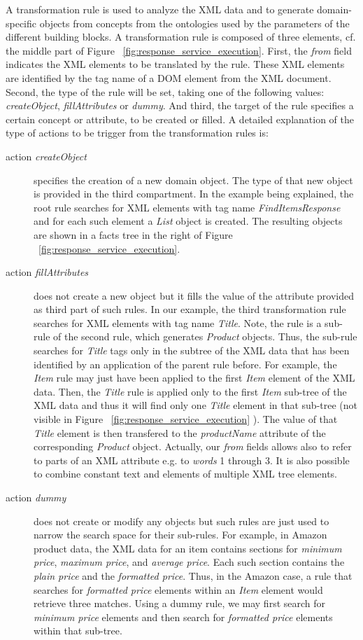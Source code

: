 A transformation rule is used to analyze the XML data and to generate domain-specific objects from concepts from the ontologies used by the parameters of the different building blocks. A transformation rule is composed of three elements, cf. the middle part of Figure ~\ref{fig:response_service_execution}. First, the \textit{from} field indicates the XML elements to be translated by the rule. These XML elements are identified by the tag name of a DOM element from the XML document. Second, the type of the rule will be set, taking one of the following values: \emph{createObject}, \emph{fillAttributes} or \emph{dummy}. And third, the target of the rule specifies a certain concept or attribute, to be created or filled. A detailed explanation of the type of actions to be trigger from the transformation rules is:
\begin{description}
	\item[action \emph{createObject}] specifies the creation of a new domain object. The type of that new object is provided in the third compartment. In the example being explained, the root rule searches for XML elements with tag name \emph{FindItemsResponse} and for each such element a \emph{List} object is created. The resulting objects are shown in a facts tree in the right of Figure ~\ref{fig:response_service_execution}.
	\item[action \emph{fillAttributes}] does not create a new object but it fills the value of the attribute provided as third part of such rules. In our example, the third transformation rule searches for XML elements with tag name \emph{Title}. Note, the rule is a sub-rule of the second rule, which generates \emph{Product} objects. Thus, the sub-rule searches for \emph{Title} tags only in the subtree of the XML data that has been identified by an application of the parent rule before. For example, the \emph{Item} rule may just have been applied to the first \emph{Item} element of the XML data. Then, the \emph{Title} rule is applied only to the first \emph{Item} sub-tree of the XML data and thus it will find only one \emph{Title} element in that sub-tree (not visible in Figure ~\ref{fig:response_service_execution} ). The value of that \emph{Title} element is then transfered to the \emph{productName} attribute of the corresponding \emph{Product} object. Actually, our \textit{from} fields allows also to refer to parts of an XML attribute e.g. to \textit{words} 1 through 3. It is also possible to combine constant text and elements of multiple XML tree elements. 
	\item[action \emph{dummy}] does not create or modify any objects but such rules are just used to narrow the search space for their sub-rules. For example, in Amazon product data, the XML data for an item contains sections for \emph{minimum price}, \emph{maximum price}, and \emph{average price}. Each such section contains the \emph{plain price} and the \emph{formatted price}. Thus, in the Amazon case, a rule that searches for \emph{formatted price} elements within an \emph{Item} element would retrieve three matches. Using a dummy rule, we may first search for \emph{minimum price} elements and then search for \emph{formatted price} elements within that sub-tree.
\end{description}

